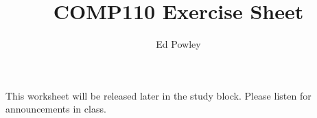 \documentclass{../../../fal_assignment}
\title{COMP110 Exercise Sheet}
\author{Ed Powley}
\begin{document}
\maketitle

This worksheet will be released later in the study block. Please listen for announcements in class.
\end{document}
